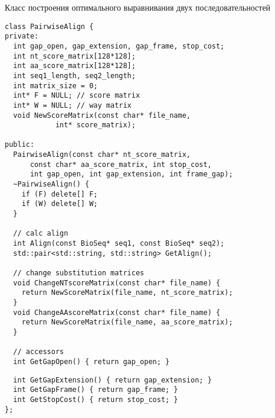 \begin{algorithm}[H]
	\caption{Класс построения оптимального выравнивания двух последовательностей} \label{lst:PairwiseAligner}
	\begin{lstlisting}
class PairwiseAlign {
private:
  int gap_open, gap_extension, gap_frame, stop_cost;
  int nt_score_matrix[128*128];
  int aa_score_matrix[128*128];
  int seq1_length, seq2_length; 
  int matrix_size = 0;
  int* F = NULL; // score matrix
  int* W = NULL; // way matrix
  void NewScoreMatrix(const char* file_name, 
  			int* score_matrix);

public:
  PairwiseAlign(const char* nt_score_matrix, 
      const char* aa_score_matrix, int stop_cost, 
      int gap_open, int gap_extension, int frame_gap);
  ~PairwiseAlign() { 
  	if (F) delete[] F; 
  	if (W) delete[] W; 
  }
  
  // calc align 
  int Align(const BioSeq* seq1, const BioSeq* seq2);
  std::pair<std::string, std::string> GetAlign();
  
  // change substitution matrices
  void ChangeNTscoreMatrix(const char* file_name) {
    return NewScoreMatrix(file_name, nt_score_matrix);
  }
  void ChangeAAscoreMatrix(const char* file_name) {
    return NewScoreMatrix(file_name, aa_score_matrix);
  }
  
  // accessors
  int GetGapOpen() { return gap_open; } 
  	\end{lstlisting}
\end{algorithm}

\begin{algorithm}
	\begin{lstlisting}
  int GetGapExtension() { return gap_extension; } 
  int GetGapFrame() { return gap_frame; } 
  int GetStopCost() { return stop_cost; } 
};
	\end{lstlisting}
\end{algorithm}

